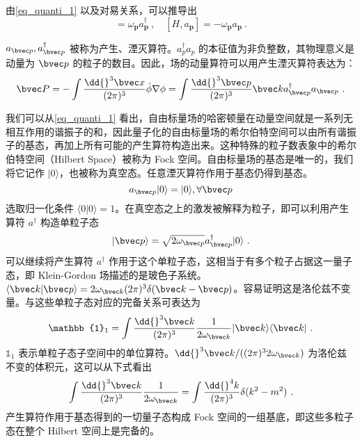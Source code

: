 由\autoref{eq_quanti_1} 以及对易关系，可以推导出
\begin{equation}
[H,a_{\mathbf p}^\dagger] = \omega_{\mathbf p} a^\dagger_{\mathbf p}~, \quad [H,a_{\mathbf p}] = -\omega_{\mathbf p} a_{\mathbf p}~.
\end{equation}

$a_{\bvec p},a_{\bvec p}^\dagger$ 被称为产生、湮灭算符。$a_p^\dagger a_p$ 的本征值为非负整数，其物理意义是动量为 $\bvec p$ 的粒子的数目。因此，场的动量算符可以用产生湮灭算符表达为：
\begin{equation}
\bvec P=-\int \frac{\dd{}^3 \bvec x}{(2\pi)^3}\dot\phi\nabla\phi=\int \frac{\dd{}^3 \bvec p}{(2\pi)^3 }\bvec k a_{\bvec p}^\dagger a_{\bvec p}~.
\end{equation} 

我们可以从\autoref{eq_quanti_1} 看出，自由标量场的哈密顿量在动量空间就是一系列无相互作用的谐振子的和，因此量子化的自由标量场的希尔伯特空间可以由所有谐振子的基态，再加上所有可能的产生算符构造出来。这种特殊的粒子数表象中的希尔伯特空间（Hilbert Space）被称为 Fock 空间。自由标量场的基态是唯一的，我们将它记作 $|0\rangle$，也被称为真空态。任意湮灭算符作用于基态仍得到基态。
\begin{equation}
a_{\bvec p} |0\rangle = |0\rangle,\forall \bvec p
\end{equation}
选取归一化条件 $\langle 0|0\rangle=1$。在真空态之上的激发被解释为粒子，即可以利用产生算符 $a^\dagger$ 构造单粒子态
\begin{equation}
|\bvec p\rangle = \sqrt{2\omega_{\bvec p}}a^\dagger_{\bvec p} |0\rangle~.
\end{equation}
可以继续将产生算符 $a^\dagger$ 作用于这个单粒子态，这相当于有多个粒子占据这一量子态，即 Klein-Gordon 场描述的是玻色子系统。$\langle \bvec k|\bvec p\rangle = 2\omega_{\bvec k}(2\pi)^3\delta(\bvec k-\bvec p)$。容易证明这是洛伦兹不变量。与这些单粒子态对应的完备关系可表达为
\begin{equation}
\mathbb{1}_1 = \int \frac{\dd{}^3 \bvec k}{(2\pi)^{3}}\frac{1}{2\omega_{\bvec k}}|\bvec k\rangle \langle \bvec k|~.
\end{equation}
$\mathbb{1}_1$ 表示单粒子态子空间中的单位算符。$\dd{}^3 \bvec k/((2\pi)^3 2\omega_{\bvec k})$ 为洛伦兹不变的体积元，这可以从下式看出
\begin{equation}
\int \frac{\dd{}^3\bvec k}{(2\pi)^3}\frac{1}{2\omega_{\bvec k}}=\int \frac{\dd{}^4 k}{(2\pi)^3} \delta(k^2-m^2)~.
\end{equation}
产生算符作用于基态得到的一切量子态构成 Fock 空间的一组基底，即这些多粒子态在整个 Hilbert 空间上是完备的。

